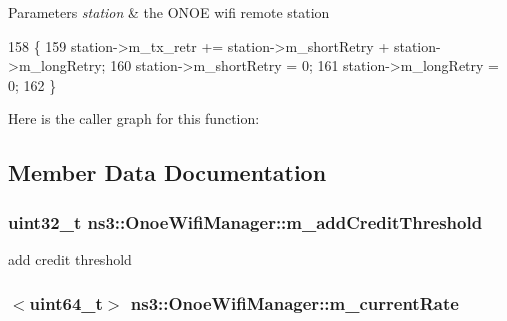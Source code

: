 \begin{DoxyParams}{Parameters}
{\em station} & the O\+N\+OE wifi remote station \\
\hline
\end{DoxyParams}

\begin{DoxyCode}
158 \{
159   station->m\_tx\_retr += station->m\_shortRetry + station->m\_longRetry;
160   station->m\_shortRetry = 0;
161   station->m\_longRetry = 0;
162 \}
\end{DoxyCode}


Here is the caller graph for this function\+:




\subsection{Member Data Documentation}
\subsubsection[{\texorpdfstring{m\+\_\+add\+Credit\+Threshold}{m_addCreditThreshold}}]{\setlength{\rightskip}{0pt plus 5cm}uint32\+\_\+t ns3\+::\+Onoe\+Wifi\+Manager\+::m\+\_\+add\+Credit\+Threshold\hspace{0.3cm}{\ttfamily [private]}}\hypertarget{classns3_1_1OnoeWifiManager_ab90c1f44166227ffa41233b0c7c65a52}{}\label{classns3_1_1OnoeWifiManager_ab90c1f44166227ffa41233b0c7c65a52}


add credit threshold 

\subsubsection[{\texorpdfstring{m\+\_\+current\+Rate}{m_currentRate}}]{$<$uint64\+\_\+t$>$ ns3\+::\+Onoe\+Wifi\+Manager\+::m\+\_\+current\+Rate\hspace{0.3cm}{\ttfamily [private]}}\hypertarget{classns3_1_1OnoeWifiManager_a5ba916c2f45dd5687c035db25dc86800}{}\label{classns3_1_1OnoeWifiManager_a5ba916c2f45dd5687c035db25dc86800}


